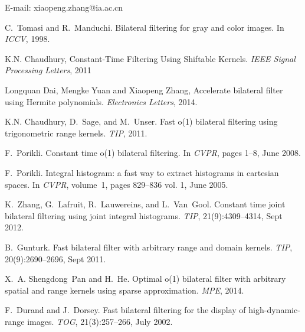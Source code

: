 \documentclass[twocolumn]{el-author}
\begin{document}
\noindent E-mail: xiaopeng.zhang@ia.ac.cn


\begin{thebibliography}{}
C.~Tomasi and R.~Manduchi. Bilateral filtering for gray and color images. In \emph{ICCV}, 1998.
	
K.N. Chaudhury, Constant-Time Filtering Using Shiftable Kernels. \emph{IEEE Signal Processing Letters}, 2011

Longquan  Dai, Mengke Yuan and Xiaopeng Zhang, Accelerate bilateral filter using Hermite polynomials. \emph{Electronics Letters}, 2014.


K.N. Chaudhury, D.~Sage, and M.~Unser. Fast o(1) bilateral filtering using trigonometric range kernels. \emph{TIP},  2011.

F.~Porikli. Constant time o(1) bilateral filtering. In {\em CVPR},
  pages 1--8, June 2008.

F.~Porikli. Integral histogram: a fast way to extract histograms in cartesian
  spaces. In {\em CVPR},
  volume~1, pages 829--836 vol. 1, June 2005.

K.~Zhang, G.~Lafruit, R.~Lauwereins, and L.~Van~Gool.
 Constant time joint bilateral filtering using joint integral
  histograms.
 {\em TIP}, 21(9):4309--4314, Sept
  2012.

B.~Gunturk.
Fast bilateral filter with arbitrary range and domain kernels.
 {\em TIP}, 20(9):2690--2696, Sept
  2011.

X.~A. Shengdong~Pan and H.~He.
 Optimal o(1) bilateral filter with arbitrary spatial and range
  kernels using sparse approximation.
 {\em MPE}, 2014.

F.~Durand and J.~Dorsey.
Fast bilateral filtering for the display of high-dynamic-range
  images.
{\em TOG}, 21(3):257--266, July 2002.

\end{thebibliography}
\end{document}
